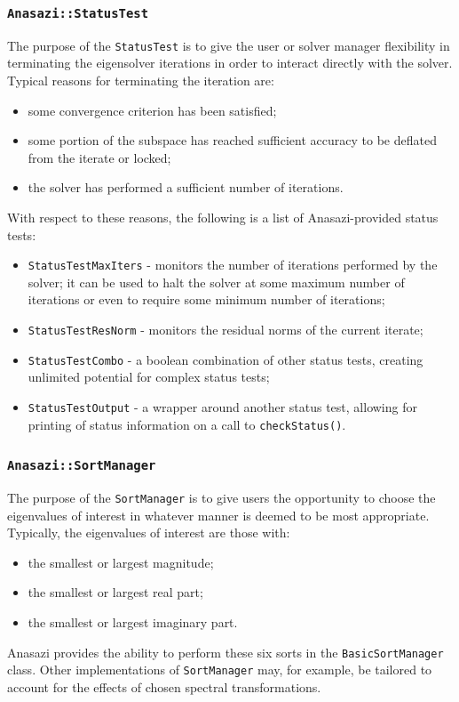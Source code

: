 \documentclass[acmtoms,acmnow]{acmtrans2m}
\newcommand{\aspace}[1]{\texttt{#1}}
\begin{document}
\subsubsection{\aspace{Anasazi::StatusTest}}

The purpose of the \aspace{StatusTest} is to give the user or solver
manager flexibility in terminating the eigensolver iterations in
order to interact directly with the solver. Typical
reasons for terminating the iteration are:
\begin{itemize}
  \item some convergence criterion has been satisfied;
  \item some portion of the subspace has reached sufficient accuracy to be
  deflated from the iterate or locked;
  \item the solver has performed a sufficient number of iterations.
\end{itemize}
With respect to these reasons, the following is a list of Anasazi-provided status tests:
\begin{itemize}
  \item \aspace{StatusTestMaxIters} - monitors the number of iterations
    performed by the solver; it can be used to halt the solver at some maximum number of iterations
    or even to require some minimum number of iterations;
  \item \aspace{StatusTestResNorm} - monitors the residual norms of the
    current iterate;
  \item \aspace{StatusTestCombo} - a boolean combination of
    other status tests, creating unlimited potential for complex status tests;
  \item \aspace{StatusTestOutput} - a wrapper around another
    status test, allowing for printing of status information on a call to
    \verb!checkStatus()!.
\end{itemize}

\subsubsection{\aspace{Anasazi::SortManager}}

The purpose of the \aspace{SortManager} is to give users the opportunity to choose the 
eigenvalues of interest in whatever manner is deemed to be most appropriate. 
Typically, the eigenvalues of interest are those with:
\begin{itemize}
  \item the smallest or largest magnitude;
  \item the smallest or largest real part;
  \item the smallest or largest imaginary part.
\end{itemize}
Anasazi provides the ability to perform these six sorts in the \aspace{BasicSortManager}
class. Other implementations of \aspace{SortManager} may, for example, be tailored to
account for the effects of chosen spectral transformations.
\end{document}
